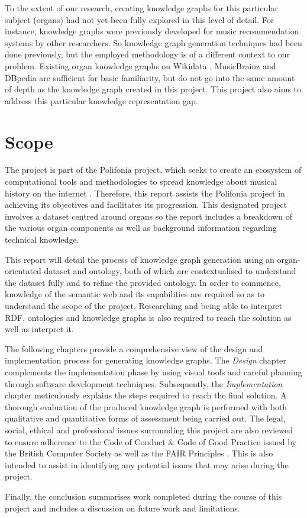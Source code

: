 To the extent of our research, creating knowledge graphs for this particular subject (organs) had not yet been fully explored in this level of detail. For instance, knowledge graphs were previously developed for music recommendation systems \cite{oramas2016sound} by other researchers. So knowledge graph generation techniques had been done previously, but the employed methodology is of a different context to our problem. Existing organ knowledge graphs on Wikidata \cite{organwikidata}, MusicBrainz \cite{organmusicbrainz} and DBpedia \cite{organdbpedia} are sufficient for basic familiarity, but do not go into the same amount of depth as the knowledge graph created in this project. This project also aims to address this particular knowledge representation gap. 

\section{Scope}
The project is part of the Polifonia project, which seeks to create an ecosystem of computational tools and methodologies to spread knowledge about musical history on the internet \cite{polifoniaproject}. Therefore, this report assists the Polifonia project in achieving its objectives and facilitates its progression. This designated project involves a dataset centred around organs so the report includes a breakdown of the various organ components as well as background information regarding technical knowledge. 

This report will detail the process of knowledge graph generation using an organ-orientated dataset and ontology, both of which are contextualised to understand the dataset fully and to refine the provided ontology. In order to commence, knowledge of the semantic web and its capabilities are required so as to understand the scope of the project. Researching and being able to interpret RDF, ontologies and knowledge graphs is also required to reach the solution as well as interpret it. 

The following chapters provide a comprehensive view of the design and implementation process for generating knowledge graphs. The \textit{Design} chapter complements the implementation phase by using visual tools and careful planning through software development techniques. Subsequently, the \textit{Implementation} chapter meticulously explains the steps required to reach the final solution. A thorough evaluation of the produced knowledge graph is performed with both qualitative and quantitative forms of assessment being carried out. The legal, social, ethical and professional issues surrounding this project are also reviewed to ensure adherence to the Code of Conduct \& Code of Good Practice issued by the British Computer Society \cite{bcs} as well as the FAIR Principles \cite{fairprinciples}. This is also intended to assist in identifying any potential issues that may arise during the project.

Finally, the conclusion summarises work completed during the course of this project and includes a discussion on future work and limitations. 
